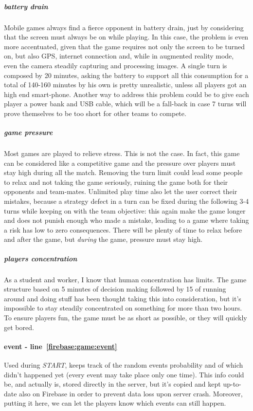 				\subparagraph{battery drain}
				Mobile games always find a fierce opponent in battery drain, just by considering that the screen must always be on while playing.
				In this case, the problem is even more accentuated, given that the game requires not only the screen to be turned on, but also GPS, internet connection and, while in augmented reality mode, even the camera steadily capturing and processing images.
				A single turn is composed by 20 minutes, asking the battery to support all this consumption for a total of 140-160 minutes by his own is pretty unrealistic, unless all players got an high end smart-phone.
				Another way to address this problem could be to give each player a power bank and USB cable, which will be a fall-back in case 7 turns will prove themselves to be too short for other teams to compete.
				
				\subparagraph{game pressure}
				Most games are played to relieve stress. This is not the case. In fact, this game can be considered like a competitive game and the pressure over players must stay high during all the match. Removing the turn limit could lead some people to relax and not taking the game seriously, ruining the game both for their opponents and team-mates.
				Unlimited play time also let the user correct their mistakes, because a strategy defect in a turn can be fixed during the following 3-4 turns while keeping on with the team objective: this again make the game longer and does not punish enough who made a mistake, leading to a game where taking a risk has low to zero consequences.
				There will be plenty of time to relax before and after the game, but \emph{during} the game, pressure must stay high.
				
				\subparagraph{players concentration}
				As a student and worker, I know that human concentration has limits. The game structure based on 5 minutes of decision making followed by 15 of running around and doing stuff has been thought taking this into consideration, but it's impossible to stay steadily concentrated on something for more than two hours.
				To ensure players fun, the game must be as short as possible, or they will quickly get bored.
				
				
				\paragraph{event - line~\ref{firebase:game:event}}
				Used during \emph{START}, keeps track of the random events probability and of which didn't happened yet (every event may take place only one time). This info could be, and actually is, stored directly in the server, but it's copied and kept up-to-date also on Firebase in order to prevent data loss upon server crash. Moreover, putting it here, we can let the players know which events can still happen.
			
